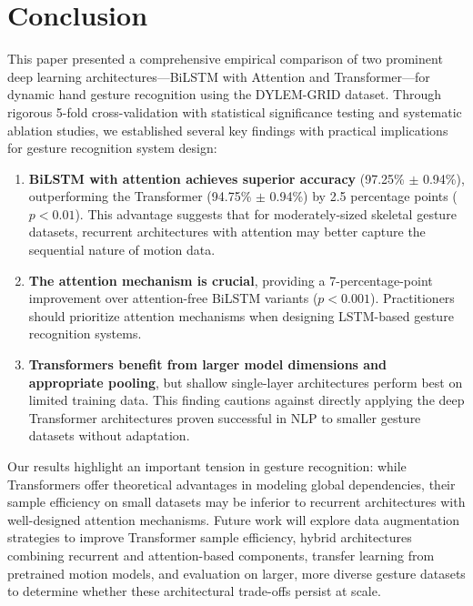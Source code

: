 \documentclass[conference]{IEEEtran}
\begin{document}
\section{Conclusion}

This paper presented a comprehensive empirical comparison of two prominent deep learning architectures---BiLSTM with Attention and Transformer---for dynamic hand gesture recognition using the DYLEM-GRID dataset. Through rigorous 5-fold cross-validation with statistical significance testing and systematic ablation studies, we established several key findings with practical implications for gesture recognition system design:

\begin{enumerate}
    \item \textbf{BiLSTM with attention achieves superior accuracy} (97.25\% $\pm$ 0.94\%), outperforming the Transformer (94.75\% $\pm$ 0.94\%) by 2.5 percentage points ($p < 0.01$). This advantage suggests that for moderately-sized skeletal gesture datasets, recurrent architectures with attention may better capture the sequential nature of motion data.
    
    \item \textbf{The attention mechanism is crucial}, providing a 7-percentage-point improvement over attention-free BiLSTM variants ($p < 0.001$). Practitioners should prioritize attention mechanisms when designing LSTM-based gesture recognition systems.
    
    \item \textbf{Transformers benefit from larger model dimensions and appropriate pooling}, but shallow single-layer architectures perform best on limited training data. This finding cautions against directly applying the deep Transformer architectures proven successful in NLP to smaller gesture datasets without adaptation.
\end{enumerate}

Our results highlight an important tension in gesture recognition: while Transformers offer theoretical advantages in modeling global dependencies, their sample efficiency on small datasets may be inferior to recurrent architectures with well-designed attention mechanisms. Future work will explore data augmentation strategies to improve Transformer sample efficiency, hybrid architectures combining recurrent and attention-based components, transfer learning from pretrained motion models, and evaluation on larger, more diverse gesture datasets to determine whether these architectural trade-offs persist at scale.
\end{document}
